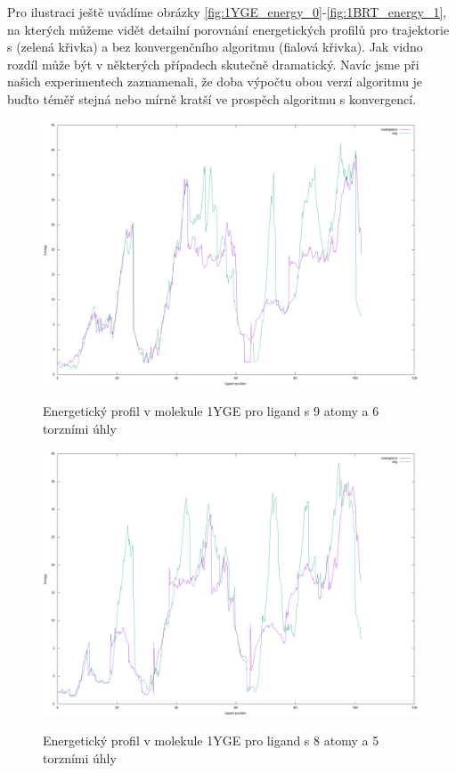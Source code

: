 Pro ilustraci ještě uvádíme obrázky \ref{fig:1YGE_energy_0}-\ref{fig:1BRT_energy_1},
na kterých můžeme vidět detailní porovnání energetických profilů pro trajektorie
s (zelená křivka) a bez konvergenčního algoritmu (fialová křivka). Jak vidno
rozdíl může být v některých případech skutečně dramatický. Navíc jsme při našich
experimentech zaznamenali, že doba výpočtu obou verzí algoritmu je buďto téměř
stejná nebo mírně kratší ve prospěch algoritmu s konvergencí.

\begin{figure}[ht]
\centering
\begin{minipage}{.49\textwidth}
  \centering
    \includegraphics[width=1\textwidth]{img/1YGE_energy_0.png}
    \caption{Energetický profil v molekule 1YGE pro ligand s 9 atomy a 6 torzními úhly}
  \centering
  \label{fig:1YGE_energy_0}
\end{minipage}%
\hfill
\begin{minipage}{.49\textwidth}
     \centering
    \includegraphics[width=1\textwidth]{img/1YGE_energy_1.png}
    \caption{Energetický profil v molekule 1YGE pro ligand s 8 atomy a 5 torzními úhly}
  \centering
  \label{fig:1YGE_energy_1}
\end{minipage}
\end{figure}

